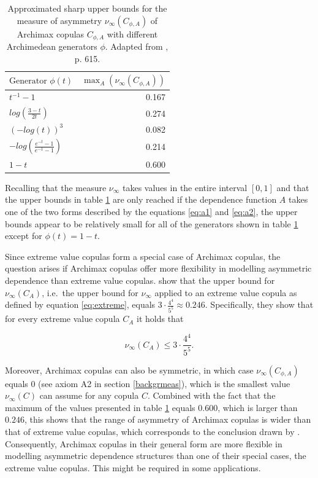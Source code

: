 \documentclass[
]{krantz}
\begin{document}
\begin{table}

\caption{\label{tab:archiBoundsClaudia}Approximated sharp upper bounds for the measure of asymmetry $\nu_\infty(C_{\phi, A})$ of Archimax copulas $C_{\phi, A}$ with different Archimedean generators $\phi$. Adapted from \citet{durante2010b}, p. 615.}
\centering
\begin{tabular}[t]{lr}
\toprule
$\text{Generator } \phi(t)$ & $\max_{A}(\nu_\infty(C_{\phi, A}))$\\
\midrule
$t^{-1}-1$ & 0.167\\
$log(\frac{3-t}{2t})$ & 0.274\\
$(-log(t))^3$ & 0.082\\
$-log\left( \frac{e^{-t} - 1}{e^{-1} - 1} \right)$ & 0.214\\
$1-t$ & 0.600\\
\bottomrule
\end{tabular}
\end{table}

Recalling that the measure \(\nu_\infty\) takes values in the entire interval \([0,1]\) and that the upper bounds in table \ref{tab:archiBoundsClaudia} are only reached if the dependence function \(A\) takes one of the two forms described by the equations \eqref{eq:a1} and \eqref{eq:a2}, the upper bounds appear to be relatively small for all of the generators shown in table \ref{tab:archiBoundsClaudia} except for \(\phi(t)=1-t\).

Since extreme value copulas form a special case of Archimax copulas, the question arises if Archimax copulas offer more flexibility in modelling asymmetric dependence than extreme value copulas. \citet{durante2010b} show that the upper bound for \(\nu_\infty(C_{A})\), i.e.~the upper bound for \(\nu_\infty\) applied to an extreme value copula as defined by equation \eqref{eq:extreme}, equals \(3 \cdot \frac{4^4}{5^5} \approx 0.246\). Specifically, they show that for every extreme value copula \(C_{A}\) it holds that

\begin{equation}
\nu_\infty(C_{A}) \leq 3 \cdot \frac{4^4}{5^5}.
\label{eq:upboundev}
\end{equation}

Moreover, Archimax copulas can also be symmetric, in which case \(\nu_\infty(C_{\phi, A})\) equals 0 (see axiom A2 in section \ref{backgrmeas}), which is the smallest value \(\nu_\infty(C)\) can assume for any copula \(C\). Combined with the fact that the maximum of the values presented in table \ref{tab:archiBoundsClaudia} equals \(0.600\), which is larger than \(0.246\), this shows that the range of asymmetry of Archimax copulas is wider than that of extreme value copulas, which corresponds to the conclusion drawn by \citet{durante2010b}. Consequently, Archimax copulas in their general form are more flexible in modelling asymmetric dependence structures than one of their special cases, the extreme value copulas. This might be required in some applications.
\end{document}
